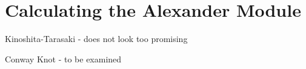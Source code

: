 \section{Calculating the Alexander Module}

Kinoshita-Tarasaki - does not look too promising

Conway Knot - to be examined
